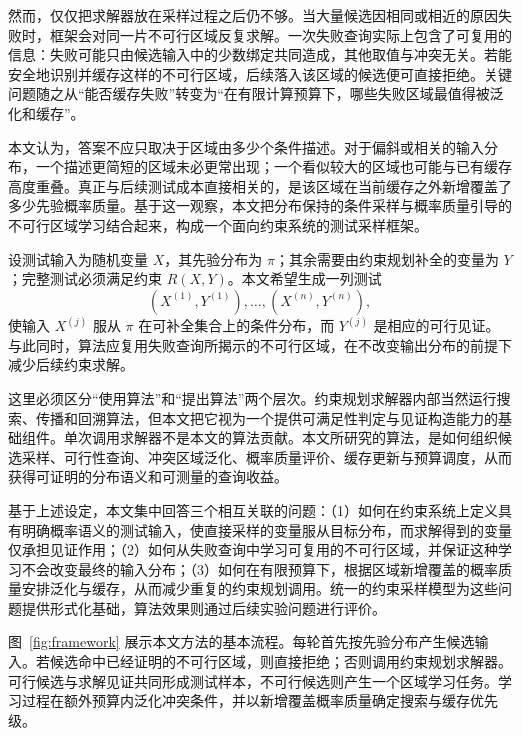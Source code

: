 \documentclass[UTF8, fontset=none, a4paper, 12pt]{ctexart}
\begin{document}
然而，仅仅把求解器放在采样过程之后仍不够。当大量候选因相同或相近的原因失败时，框架会对同一片不可行区域反复求解。一次失败查询实际上包含了可复用的信息：失败可能只由候选输入中的少数绑定共同造成，其他取值与冲突无关。若能安全地识别并缓存这样的不可行区域，后续落入该区域的候选便可直接拒绝。关键问题随之从“能否缓存失败”转变为“在有限计算预算下，哪些失败区域最值得被泛化和缓存”。

本文认为，答案不应只取决于区域由多少个条件描述。对于偏斜或相关的输入分布，一个描述更简短的区域未必更常出现；一个看似较大的区域也可能与已有缓存高度重叠。真正与后续测试成本直接相关的，是该区域在当前缓存之外新增覆盖了多少先验概率质量。基于这一观察，本文把分布保持的条件采样与概率质量引导的不可行区域学习结合起来，构成一个面向约束系统的测试采样框架。

设测试输入为随机变量 $X$，其先验分布为 $\pi$；其余需要由约束规划补全的变量为 $Y$；完整测试必须满足约束 $R(X,Y)$。本文希望生成一列测试
\[
  (X^{(1)},Y^{(1)}),\ldots,(X^{(n)},Y^{(n)}),
\]
使输入 $X^{(j)}$ 服从 $\pi$ 在可补全集合上的条件分布，而 $Y^{(j)}$ 是相应的可行见证。与此同时，算法应复用失败查询所揭示的不可行区域，在不改变输出分布的前提下减少后续约束求解。

这里必须区分“使用算法”和“提出算法”两个层次。约束规划求解器内部当然运行搜索、传播和回溯算法，但本文把它视为一个提供可满足性判定与见证构造能力的基础组件。单次调用求解器不是本文的算法贡献。本文所研究的算法，是如何组织候选采样、可行性查询、冲突区域泛化、概率质量评价、缓存更新与预算调度，从而获得可证明的分布语义和可测量的查询收益。

基于上述设定，本文集中回答三个相互关联的问题：（1）如何在约束系统上定义具有明确概率语义的测试输入，使直接采样的变量服从目标分布，而求解得到的变量仅承担见证作用；（2）如何从失败查询中学习可复用的不可行区域，并保证这种学习不会改变最终的输入分布；（3）如何在有限预算下，根据区域新增覆盖的概率质量安排泛化与缓存，从而减少重复的约束规划调用。统一的约束采样模型为这些问题提供形式化基础，算法效果则通过后续实验问题进行评价。

图~\ref{fig:framework} 展示本文方法的基本流程。每轮首先按先验分布产生候选输入。若候选命中已经证明的不可行区域，则直接拒绝；否则调用约束规划求解器。可行候选与求解见证共同形成测试样本，不可行候选则产生一个区域学习任务。学习过程在额外预算内泛化冲突条件，并以新增覆盖概率质量确定搜索与缓存优先级。
\end{document}
